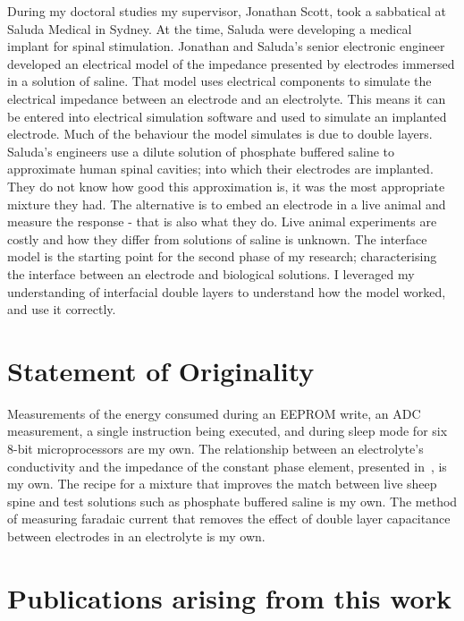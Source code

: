   During my doctoral studies my supervisor, Jonathan Scott, took a sabbatical at Saluda Medical in Sydney.
  At the time, Saluda were developing a medical implant for spinal stimulation.
  Jonathan and Saluda's senior electronic engineer developed an electrical model of the impedance presented by electrodes immersed in a solution of saline.
  That model uses electrical components to simulate the electrical impedance between an electrode and an electrolyte.
  This means it can be entered into electrical simulation software and used to simulate an implanted electrode.
  Much of the behaviour the model simulates is due to double layers.
  Saluda's engineers use a dilute solution of phosphate buffered saline to approximate human spinal cavities; into which their electrodes are implanted.
  They do not know how good this approximation is, it was the most appropriate mixture they had.
  The alternative is to embed an electrode in a live animal and measure the response - that is also what they do.
  Live animal experiments are costly and how they differ from solutions of saline is unknown.
  The interface model is the starting point for the second phase of my research; characterising the interface between an electrode and biological solutions.
  I leveraged my understanding of interfacial double layers to understand how the model worked, and use it correctly.


\section{Statement of Originality}


  Measurements of the energy consumed during an EEPROM write, an ADC measurement, a single instruction being executed, and during sleep mode for six 8-bit microprocessors are my own.
  The relationship between an electrolyte's conductivity and the impedance of the constant phase element, presented in~, is my own.
  The recipe for a mixture that improves the match between live sheep spine and test solutions such as phosphate buffered saline is my own.
  The method of measuring faradaic current that removes the effect of double layer capacitance between electrodes in an electrolyte is my own.


\section{Publications arising from this work}


